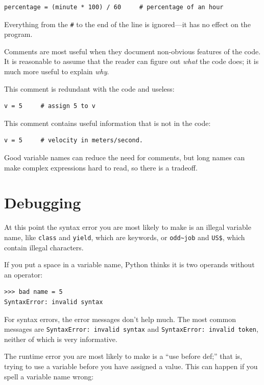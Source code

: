 \documentclass[10pt]{book}
\begin{document}
\beforeverb
\begin{verbatim}
percentage = (minute * 100) / 60     # percentage of an hour
\end{verbatim}
\afterverb
%
Everything from the {\tt \#} to the end of the line is ignored---it
has no effect on the program.

Comments are most useful when they document non-obvious features of
the code.  It is reasonable to assume that the reader can figure out
{\em what} the code does; it is much more useful to explain {\em why}.

This comment is redundant with the code and useless:

\beforeverb
\begin{verbatim}
v = 5     # assign 5 to v
\end{verbatim}
\afterverb
%
This comment contains useful information that is not in the code:

\beforeverb
\begin{verbatim}
v = 5     # velocity in meters/second. 
\end{verbatim}
\afterverb
%
Good variable names can reduce the need for comments, but
long names can make complex expressions hard to read, so there is
a tradeoff.

\section{Debugging}

At this point the syntax error you are most likely to make is
an illegal variable name, like {\tt class} and {\tt yield}, which
are keywords, or \verb"odd~job" and \verb"US$", which contain
illegal characters.


If you put a space in a variable name, Python thinks it is two
operands without an operator:

\beforeverb
\begin{verbatim}
>>> bad name = 5
SyntaxError: invalid syntax
\end{verbatim}
\afterverb
%
For syntax errors, the error messages don't help much.
The most common messages are {\tt SyntaxError: invalid syntax} and
{\tt SyntaxError: invalid token}, neither of which is very informative.


The runtime error you are most likely to make is a ``use before
def;'' that is, trying to use a variable before you have assigned
a value.  This can happen if you spell a variable name wrong:
\end{document}
